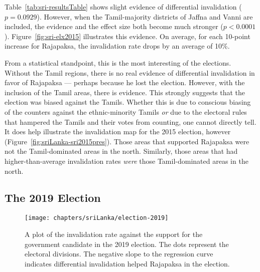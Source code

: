 Table~\ref{tab:sri-resultsTable} shows slight evidence of differential invalidation ($p=0.0929$). However, when the Tamil-majority districts of Jaffna and Vanni are included, the evidence and the effect size both become much stronger ($p < 0.0001$). Figure~\ref{fig:sri-elx2015} illustrates this evidence. On average, for each 10-point increase for Rajapaksa, the invalidation rate drops by an average of 10\%.

From a statistical standpoint, this is the most interesting of the elections. Without the Tamil regions, there is no real evidence of differential invalidation in favor of Rajapaksa --- perhaps because he lost the election. However, with the inclusion of the Tamil areas, there is evidence. This strongly suggests that the election was biased against the Tamils. Whether this is due to conscious biasing of the counters against the ethnic-minority Tamils \emph{or} due to the electoral rules that hampered the Tamils and their votes from counting, one cannot directly tell. It does help illustrate the invalidation map for the 2015 election, however (Figure~\ref{fig:sriLanka-sri2015pres}). Those areas that supported Rajapaksa were not the Tamil-dominated areas in the north. Similarly, those areas that had higher-than-average invalidation rates \emph{were} those Tamil-dominated areas in the north. 



















\subsection{The 2019 Election}

\begin{figure}[t]
\texttt{[image: chapters/sriLanka/election-2019]}
\caption[Invalidation plot for the 2019 presidential election]{A plot of the invalidation rate against the support for the government candidate in the 2019 election. The dots represent the electoral divisions. The negative slope to the regression curve indicates differential invalidation helped Rajapaksa in the election.}
\label{fig:sri-elx2019}
\end{figure}

